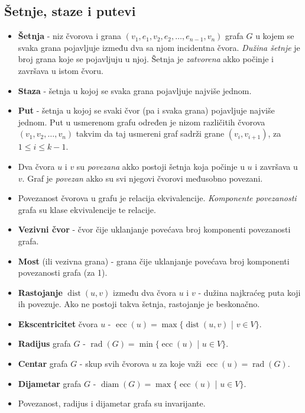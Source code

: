 \documentclass[a4paper,12pt]{article}
\numberwithin{algorithm}{section}
\theoremstyle{plain}
\theoremstyle{definition}
\theoremstyle{remark}
\begin{document}
\subsection{Šetnje, staze i putevi}
\begin{itemize}
    \item \textbf{Šetnja} - niz čvorova i grana $(v_1, e_1, v_2, e_2, \ldots, e_{n-1}, v_n)$ grafa $G$ u kojem se svaka grana pojavljuje između dva sa njom incidentna čvora. \textit{Dužina šetnje} je broj grana koje se pojavljuju u njoj. Šetnja je \textit{zatvorena} akko počinje i završava u istom čvoru.
    \item \textbf{Staza} - šetnja u kojoj se svaka grana pojavljuje najviše jednom. 
    \item \textbf{Put} - šetnja u kojoj se svaki čvor (pa i svaka grana) pojavljuje najviše jednom. Put u usmerenom grafu određen je nizom različitih čvorova $(v_1, v_2, \ldots, v_n)$ takvim da taj usmereni graf sadrži grane $(v_i, v_{i+1})$, za $1 \leq i \leq k-1$.
    \item Dva čvora $u$ i $v$ su \textit{povezana} akko postoji šetnja koja počinje u $u$ i završava u $v$. Graf je \textit{povezan} akko su svi njegovi čvorovi međusobno povezani.
    \item Povezanost čvorova u grafu je relacija ekvivalencije. \textit{Komponente povezanosti} grafa su klase ekvivalencije te relacije.
    \item \textbf{Vezivni čvor} - čvor čije uklanjanje povećava broj komponenti povezanosti grafa.
    \item \textbf{Most} (ili vezivna grana) - grana čije uklanjanje povećava broj komponenti povezanosti grafa (za 1).
    \item \textbf{Rastojanje} $\operatorname{dist}(u, v)$ između dva čvora $u$ i $v$ - dužina najkraćeg puta koji ih povezuje. Ako ne postoji takva šetnja, rastojanje je beskonačno.
    \item \textbf{Ekscentricitet} čvora $u$ - $\operatorname{ecc}(u) = \max \{ \operatorname{dist}(u, v)$ | $v \in V \}$.
    \item \textbf{Radijus} grafa $G$ - $\operatorname{rad}(G) = \min \{ \operatorname{ecc}(u)$ | $u \in V \}$.
    \item \textbf{Centar} grafa $G$ - skup svih čvorova $u$ za koje važi $\operatorname{ecc}(u) = \operatorname{rad}(G)$.
    \item \textbf{Dijametar} grafa $G$ - $\operatorname{diam}(G) = \max \{ \operatorname{ecc}(u)$ | $u \in V \}$.
    \item Povezanost, radijus i dijametar grafa su invarijante.
\end{itemize}
\end{document}
